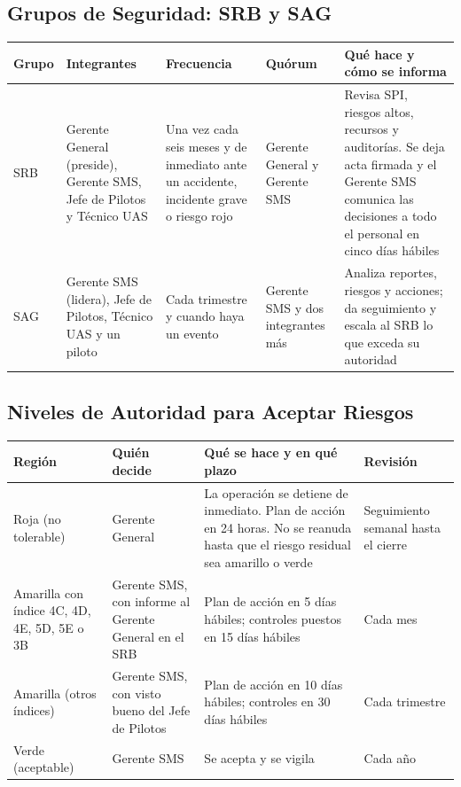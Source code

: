 \subsection{Grupos de Seguridad: SRB y SAG}
\begin{longtable}{|>{\RaggedRight\arraybackslash}p{2.2cm}|>{\RaggedRight\arraybackslash}p{3.2cm}|>{\RaggedRight\arraybackslash}p{3.2cm}|>{\RaggedRight\arraybackslash}p{3.0cm}|>{\RaggedRight\arraybackslash}p{3.4cm}|}
\hline
\rowcolor[gray]{0.9}\textbf{Grupo} & \textbf{Integrantes} & \textbf{Frecuencia} & \textbf{Quórum} & \textbf{Qué hace y cómo se informa} \\ \hline
\endhead
SRB & Gerente General (preside), Gerente SMS, Jefe de Pilotos y Técnico UAS & Una vez cada seis meses y de inmediato ante un accidente, incidente grave o riesgo rojo & Gerente General y Gerente SMS & Revisa SPI, riesgos altos, recursos y auditorías. Se deja acta firmada y el Gerente SMS comunica las decisiones a todo el personal en cinco días hábiles \\ \hline
SAG & Gerente SMS (lidera), Jefe de Pilotos, Técnico UAS y un piloto & Cada trimestre y cuando haya un evento & Gerente SMS y dos integrantes más & Analiza reportes, riesgos y acciones; da seguimiento y escala al SRB lo que exceda su autoridad \\ \hline
\end{longtable}

\subsection{Niveles de Autoridad para Aceptar Riesgos}
\begin{longtable}{|>{\RaggedRight\arraybackslash}p{3cm}|>{\RaggedRight\arraybackslash}p{4.3cm}|>{\RaggedRight\arraybackslash}p{4.4cm}|>{\RaggedRight\arraybackslash}p{3.7cm}|}
\hline
\rowcolor[gray]{0.9}\textbf{Región} & \textbf{Quién decide} & \textbf{Qué se hace y en qué plazo} & \textbf{Revisión} \\ \hline
\endhead
Roja (no tolerable) & Gerente General & La operación se detiene de inmediato. Plan de acción en 24 horas. No se reanuda hasta que el riesgo residual sea amarillo o verde & Seguimiento semanal hasta el cierre \\ \hline
Amarilla con índice 4C, 4D, 4E, 5D, 5E o 3B & Gerente SMS, con informe al Gerente General en el SRB & Plan de acción en 5 días hábiles; controles puestos en 15 días hábiles & Cada mes \\ \hline
Amarilla (otros índices) & Gerente SMS, con visto bueno del Jefe de Pilotos & Plan de acción en 10 días hábiles; controles en 30 días hábiles & Cada trimestre \\ \hline
Verde (aceptable) & Gerente SMS & Se acepta y se vigila & Cada año \\ \hline
\end{longtable}


